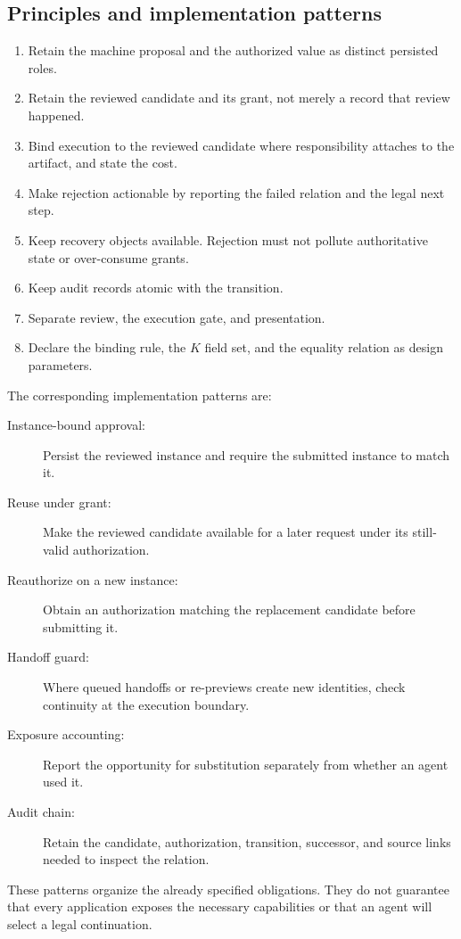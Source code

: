 \subsection{Principles and implementation patterns}
\begin{enumerate}
\item Retain the machine proposal and the authorized value as distinct persisted roles.
\item Retain the reviewed candidate and its grant, not merely a record that review happened.
\item Bind execution to the reviewed candidate where responsibility attaches to the artifact, and state the cost.
\item Make rejection actionable by reporting the failed relation and the legal next step.
\item Keep recovery objects available. Rejection must not pollute authoritative state or over-consume grants.
\item Keep audit records atomic with the transition.
\item Separate review, the execution gate, and presentation.
\item Declare the binding rule, the $K$ field set, and the equality relation as design parameters.
\end{enumerate}

The corresponding implementation patterns are:
\begin{description}
\item[Instance-bound approval:] Persist the reviewed instance and require the submitted instance to match it.
\item[Reuse under grant:] Make the reviewed candidate available for a later request under its still-valid authorization.
\item[Reauthorize on a new instance:] Obtain an authorization matching the replacement candidate before submitting it.
\item[Handoff guard:] Where queued handoffs or re-previews create new identities, check continuity at the execution boundary.
\item[Exposure accounting:] Report the opportunity for substitution separately from whether an agent used it.
\item[Audit chain:] Retain the candidate, authorization, transition, successor, and source links needed to inspect the relation.
\end{description}
These patterns organize the already specified obligations. They do not guarantee that every application exposes the necessary capabilities or that an agent will select a legal continuation.

